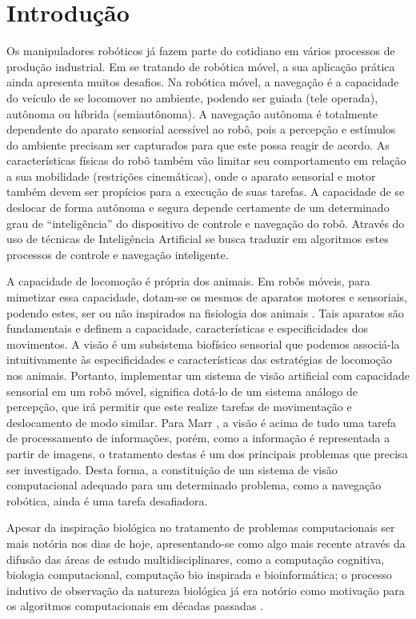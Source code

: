 \chapter{Introdução} 
\label{cap:introducao}


Os manipuladores robóticos já fazem parte do cotidiano em vários processos de
produção industrial. Em se tratando de robótica móvel, a sua aplicação prática
ainda apresenta muitos desafios. Na robótica móvel, a navegação é a capacidade
do veículo de se locomover no ambiente, podendo ser guiada (tele operada),
autônoma ou híbrida (semiautônoma). A navegação autônoma é totalmente dependente
do aparato sensorial acessível ao robô, pois a percepção e estímulos do ambiente
precisam ser capturados para que este possa reagir de acordo. As características
físicas do robô também vão limitar seu comportamento em relação a sua mobilidade
(restrições cinemáticas), onde o aparato sensorial e motor também devem ser
propícios para a execução de suas tarefas. A capacidade de se deslocar de forma
autônoma e segura depende certamente de um determinado grau de “inteligência” do
dispositivo de controle e navegação do robô. Através do uso de técnicas de
Inteligência Artificial se busca traduzir em algoritmos estes processos de
controle e navegação inteligente.

A capacidade de locomoção é própria dos animais. Em robôs móveis, para mimetizar
essa capacidade, dotam-se os mesmos de aparatos motores e sensoriais, podendo
estes, ser ou não inspirados na fisiologia dos animais \cite{Webb2000}. Tais
aparatos são fundamentais e definem a capacidade, características e
especificidades dos movimentos. A visão é um subsistema biofísico sensorial que
podemos associá-la intuitivamente às especificidades e características das
estratégias de locomoção nos animais. Portanto, implementar um sistema de visão
artificial com capacidade sensorial em um robô móvel, significa dotá-lo de um
sistema análogo de percepção, que irá permitir que este realize tarefas de
movimentação e deslocamento de modo similar. Para Marr \cite{Marr1982}, a visão
é acima de tudo uma tarefa de processamento de informações, porém, como a
informação é representada a partir de imagens, o tratamento destas é um dos
principais problemas que precisa ser investigado. Desta forma, a constituição de
um sistema de visão computacional adequado para um determinado problema, como a
navegação robótica, ainda é uma tarefa desafiadora.

Apesar da inspiração biológica no tratamento de problemas computacionais ser
mais notória nos dias de hoje, apresentando-se como algo mais recente através da
difusão das áreas de estudo multidisciplinares, como a computação cognitiva,
biologia computacional, computação bio inspirada e bioinformática; o processo
indutivo de observação da natureza biológica já era notório como motivação para
os algoritmos computacionais em décadas passadas \cite{Poggio1984}.

